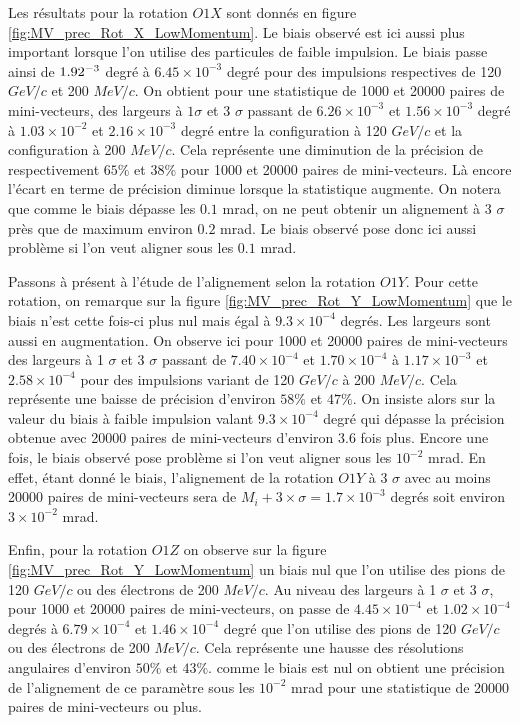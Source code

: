   Les r\'esultats pour la rotation $O1X$ sont donn\'es en figure \ref{fig:MV_prec_Rot_X_LowMomentum}. Le biais observ\'e est ici aussi plus important lorsque l'on utilise des particules de faible impulsion. Le biais passe ainsi de $1.92 \time 10^{-3}$ degr\'e \`a $6.45 \times 10^{-3}$ degr\'e pour des impulsions respectives de 120 $GeV/c$ et 200 $MeV/c$. On obtient pour une statistique de 1000 et 20000 paires de mini-vecteurs, des largeurs \`a $1 \sigma$ et 3 $\sigma$ passant de $6.26 \times 10^{-3}$ et $1.56 \times 10^{-3}$ degr\'e \`a $1.03 \times 10^{-2}$ et $2.16 \times 10^{-3}$ degr\'e entre la configuration \`a 120 $GeV/c$ et la configuration \`a 200 $MeV/c$. Cela repr\'esente une diminution de la pr\'ecision de respectivement $65\%$ et $38\%$ pour 1000 et 20000 paires de mini-vecteurs. Là encore l'\'ecart en terme de pr\'ecision diminue lorsque la statistique augmente. On notera que comme le biais d\'epasse les $0.1$ mrad, on ne peut obtenir un alignement \`a 3 $\sigma$ pr\`es que de maximum environ $0.2$ mrad. Le biais observ\'e pose donc ici aussi probl\`eme si l'on veut aligner sous les $0.1$ mrad.
  
  \medskip
   
  Passons \`a pr\'esent \`a l'\'etude de l'alignement selon la rotation $O1Y$. Pour cette rotation, on remarque sur la figure \ref{fig:MV_prec_Rot_Y_LowMomentum} que le biais n'est cette fois-ci plus nul mais \'egal \`a $9.3 \times 10^{-4}$ degr\'es. Les largeurs sont aussi en augmentation. On observe ici pour 1000 et 20000 paires de mini-vecteurs des largeurs \`a 1 $\sigma$ et 3 $\sigma$ passant de $7.40 \times 10^{-4}$ et $1.70 \times 10^{-4}$ \`a $1.17 \times 10^{-3}$ et $2.58 \times 10^{-4}$ pour des impulsions variant de 120 $GeV/c$ \`a 200 $MeV/c$. Cela repr\'esente une baisse de pr\'ecision d'environ $58\%$ et $47\%$. On insiste alors sur la valeur du biais \`a faible impulsion valant $9.3 \times 10^{-4}$ degr\'e qui d\'epasse la pr\'ecision obtenue avec 20000 paires de mini-vecteurs d'environ 3.6 fois plus. Encore une fois, le biais observ\'e pose probl\`eme si l'on veut aligner sous les $10^{-2}$ mrad. En effet, \'etant donn\'e le biais, l'alignement de la rotation $O1Y$ \`a 3 $\sigma$ avec au moins 20000 paires de mini-vecteurs sera de $M_i + 3\times \sigma = 1.7 \times 10^{-3}$ degr\'es soit environ $3 \times 10^{-2}$ mrad.
  
  \medskip
  
  Enfin, pour la rotation $O1Z$ on observe sur la figure \ref{fig:MV_prec_Rot_Y_LowMomentum} un biais nul que l'on utilise des pions de 120 $GeV/c$ ou des \'electrons de 200 $MeV/c$. Au niveau des largeurs \`a 1 $\sigma$ et 3 $\sigma$, pour 1000 et 20000 paires de mini-vecteurs, on passe de $4.45 \times 10^{-4}$ et $1.02 \times 10^{-4}$ degr\'es \`a $6.79 \times 10^{-4}$ et $1.46 \times 10^{-4}$ degr\'e que l'on utilise des pions de 120 $GeV/c$ ou des \'electrons de 200 $MeV/c$. Cela repr\'esente une hausse des r\'esolutions angulaires d'environ $50\%$ et $43\%$. comme le biais est nul on obtient une pr\'ecision de l'alignement de ce param\`etre sous les $10^{-2}$ mrad pour une statistique de 20000 paires de mini-vecteurs ou plus.
  
